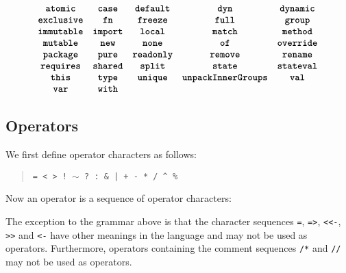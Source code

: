 \begin{quote}
 \oneof 
\end{quote}
\[
  \begin{array}{cccccc}
  \texttt{\textbf{atomic}}
  & \texttt{\textbf{case}} 
  & \texttt{\textbf{default}}
  & \texttt{\textbf{dyn}} 
  & \texttt{\textbf{dynamic}}
  \\
  \texttt{\textbf{exclusive}} 
  & \texttt{\textbf{fn}}
  & \texttt{\textbf{freeze}}
  & \texttt{\textbf{full}} 
  & \texttt{\textbf{group}}  
  \\
  \texttt{\textbf{immutable}}
  & \texttt{\textbf{import}}
  & \texttt{\textbf{local}}
  & \texttt{\textbf{match}}
  & \texttt{\textbf{method}}
  \\
  \texttt{\textbf{mutable}}
  &\texttt{\textbf{new}}
  & \texttt{\textbf{none}}
  & \texttt{\textbf{of}}
  & \texttt{\textbf{override}} 
  \\
  \texttt{\textbf{package}}
  & \texttt{\textbf{pure}}
  & \texttt{\textbf{readonly}}
  & \texttt{\textbf{remove}}
  & \texttt{\textbf{rename}}
  \\
  \texttt{\textbf{requires}}
  &\texttt{\textbf{shared}}
  & \texttt{\textbf{split}}  
  & \texttt{\textbf{state}}
  & \texttt{\textbf{stateval}}
  \\
   \texttt{\textbf{this}}
  & \texttt{\textbf{type}} 
  & \texttt{\textbf{unique}} 
  & \texttt{\textbf{unpackInnerGroups}}
  & \texttt{\textbf{val}}
  \\
  \texttt{\textbf{var}}
  &\texttt{\textbf{with}}
  \end{array}
\]







\subsection{Operators}

We first define operator characters as follows:

\begin{quote}

 \oneof

 \texttt{= < > ! $\sim$ ? : \& | + - * / \^{} \%}

\end{quote}

Now an operator is a sequence of operator characters:

\begin{quote}


 {}

 {} 

\end{quote}

The exception to the grammar above is that the character sequences
\texttt{=}, \texttt{=>}, \texttt{<<-}, \texttt{>>} and \texttt{<-} have
other meanings in the language and may not be used as operators.
Furthermore, operators containing the comment sequences \texttt{/*}
and \texttt{//} may not be used as operators.
